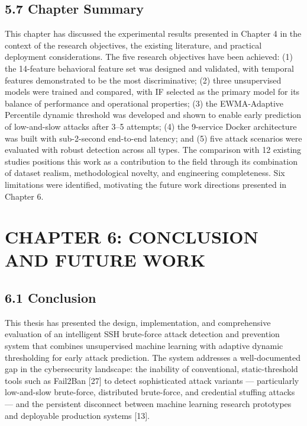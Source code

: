 \documentclass[
  a4paper]{report}
\begin{document}
\section{5.7 Chapter Summary}\label{chapter-summary}

This chapter has discussed the experimental results presented in Chapter
4 in the context of the research objectives, the existing literature,
and practical deployment considerations. The five research objectives
have been achieved: (1) the 14-feature behavioral feature set was
designed and validated, with temporal features demonstrated to be the
most discriminative; (2) three unsupervised models were trained and
compared, with IF selected as the primary model for its balance of
performance and operational properties; (3) the EWMA-Adaptive Percentile
dynamic threshold was developed and shown to enable early prediction of
low-and-slow attacks after 3--5 attempts; (4) the 9-service Docker
architecture was built with sub-2-second end-to-end latency; and (5)
five attack scenarios were evaluated with robust detection across all
types. The comparison with 12 existing studies positions this work as a
contribution to the field through its combination of dataset realism,
methodological novelty, and engineering completeness. Six limitations
were identified, motivating the future work directions presented in
Chapter 6.

\chapter{CHAPTER 6: CONCLUSION AND FUTURE
WORK}\label{chapter-6-conclusion-and-future-work}

\section{6.1 Conclusion}\label{conclusion}

This thesis has presented the design, implementation, and comprehensive
evaluation of an intelligent SSH brute-force attack detection and
prevention system that combines unsupervised machine learning with
adaptive dynamic thresholding for early attack prediction. The system
addresses a well-documented gap in the cybersecurity landscape: the
inability of conventional, static-threshold tools such as Fail2Ban
{[}27{]} to detect sophisticated attack variants --- particularly
low-and-slow brute-force, distributed brute-force, and credential
stuffing attacks --- and the persistent disconnect between machine
learning research prototypes and deployable production systems {[}13{]}.
\end{document}

